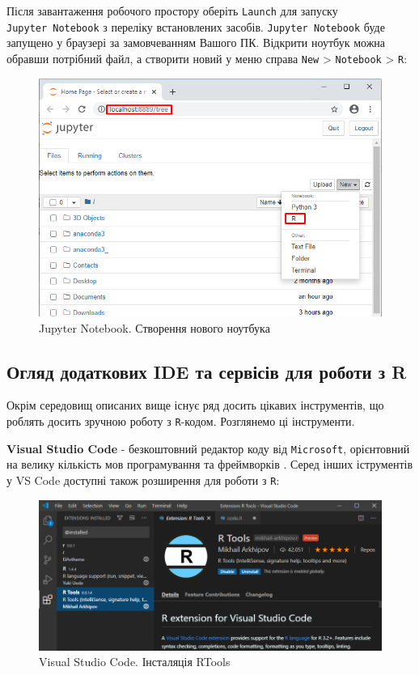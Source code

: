 \documentclass[
]{book}
\begin{document}
Після завантаження робочого простору оберіть \texttt{Launch} для запуску \texttt{Jupyter\ Notebook} з переліку встановлених засобів. \texttt{Jupyter\ Notebook} буде запущено у браузері за замовчеванням Вашого ПК. Відкрити ноутбук можна обравши потрібний файл, а створити новий у меню справа \texttt{New} \textgreater{} \texttt{Notebook} \textgreater{} \texttt{R}:

\begin{figure}
\includegraphics[width=9.64in]{images/chapter1/anaconda_6} \caption{Jupyter Notebook. Створення нового ноутбука}\label{fig:unnamed-chunk-27}
\end{figure}

\hypertarget{chapter134}{%
\subsection{Огляд додаткових IDE та сервісів для роботи з R}\label{chapter134}}

Окрім середовищ описаних вище існує ряд досить цікавих інструментів, що роблять досить зручною роботу з \texttt{R}-кодом. Розглянемо ці інструменти.

\textbf{Visual Studio Code} - безкоштовний редактор коду від \texttt{Microsoft}, орієнтовний на велику кількість мов програмування та фреймворків \citep{vs-code}. Серед інших іструментів у VS Code доступні також розширення для роботи з \texttt{R}:

\begin{figure}
\includegraphics[width=12.53in]{images/chapter1/vs_code} \caption{Visual Studio Code. Інсталяція RTools}\label{fig:unnamed-chunk-28}
\end{figure}
\end{document}
